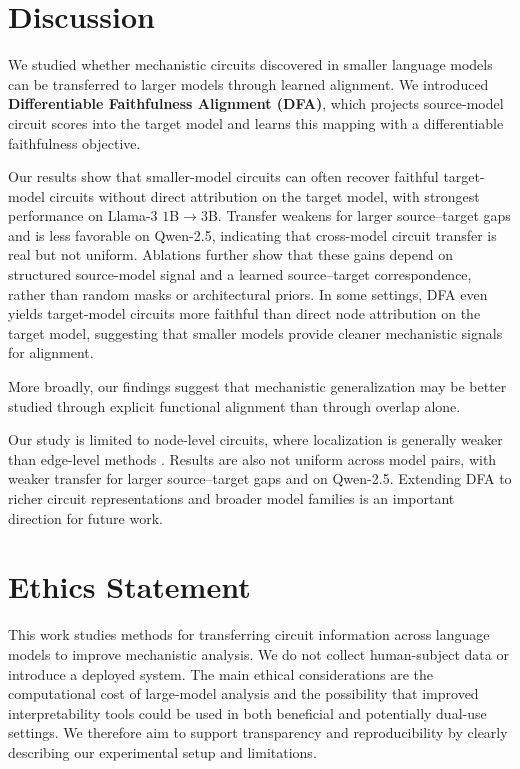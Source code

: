 \documentclass{article} %
\begin{document}
\section{Discussion}



We studied whether mechanistic circuits discovered in smaller language models can be transferred to larger models through learned alignment. We introduced \textbf{Differentiable Faithfulness Alignment (DFA)}, which projects source-model circuit scores into the target model and learns this mapping with a differentiable faithfulness objective.


Our results show that smaller-model circuits can often recover faithful target-model circuits without direct attribution on the target model, with strongest performance on Llama-3 $1$B$\rightarrow3$B. Transfer weakens for larger source--target gaps and is less favorable on Qwen-2.5, indicating that cross-model circuit transfer is real but not uniform. Ablations further show that these gains depend on structured source-model signal and a learned source--target correspondence, rather than random masks or architectural priors. In some settings, DFA even yields target-model circuits more faithful than direct node attribution on the target model, suggesting that smaller models provide cleaner mechanistic signals for alignment.

More broadly, our findings suggest that mechanistic generalization may be better studied through explicit functional alignment than through overlap alone. 



Our study is limited to node-level circuits, where localization is generally weaker than edge-level methods \citep{mib-2025}. Results are also not uniform across model pairs, with weaker transfer for larger source--target gaps and on Qwen-2.5. Extending DFA to richer circuit representations and broader model families is an important direction for future work.







\section*{Ethics Statement}
This work studies methods for transferring circuit information across language models to improve mechanistic analysis. We do not collect human-subject data or introduce a deployed system. The main ethical considerations are the computational cost of large-model analysis and the possibility that improved interpretability tools could be used in both beneficial and potentially dual-use settings. We therefore aim to support transparency and reproducibility by clearly describing our experimental setup and limitations.
\end{document}
